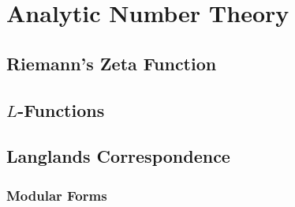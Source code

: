 \section{Analytic Number Theory}

\subsection{Riemann's Zeta Function}

\subsection{$L$-Functions}

\subsection{Langlands Correspondence}


\subsubsection{Modular Forms}




\begin{comment}



\end{comment}